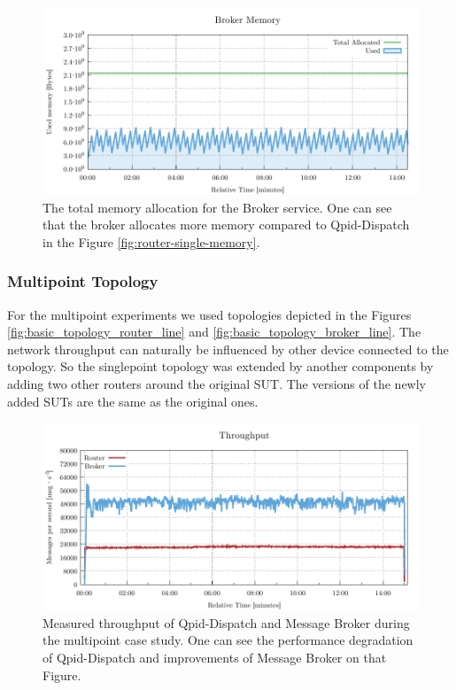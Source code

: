 \begin{figure}[H]
	\centering
	\includegraphics[width=1\linewidth]{obrazky-figures/charts/singlepoint-broker-throughput-memory.pdf}
	\caption{The total memory allocation for the Broker service. One can see that the broker allocates more memory compared to Qpid-Dispatch in the Figure \ref{fig:router-single-memory}.}
	\label{fig:broker-single-memory}
\end{figure}


\subsubsection*{Multipoint Topology}
For the multipoint experiments we used topologies depicted in the Figures \ref{fig:basic_topology_router_line} and \ref{fig:basic_topology_broker_line}. The network throughput can naturally be influenced by other device connected to the topology. So the singlepoint topology was extended by another components by adding two other routers around the original SUT. The versions of the newly added SUTs are the same as the original ones.

\begin{figure}[H]
	\centering
	\includegraphics[width=1\linewidth]{obrazky-figures/charts/multipoint-throughput.pdf}
	\caption{Measured throughput of Qpid-Dispatch and Message Broker during the multipoint case study. One can see the performance degradation of Qpid-Dispatch and improvements of Message Broker on that Figure.}
	\label{fig:rate-multipoint-router}
\end{figure}


